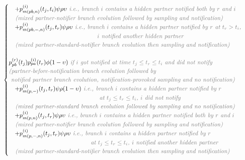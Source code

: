 \documentclass[10pt,letterpaper]{article}
\begin{document}
\begin{equation}
\begin{array}{ll}
\begin{cases}
 ~~~+p_{m(pb,n)}^{(i)}(t_j,t_i)\psi\rho\upsilon \textit{\color{gray} ~i.e., branch $i$ contains a hidden partner notified both by $r$ and $i$}\\
 \textit{\color{gray} ~~~(mixed partner-notifier branch evolution followed by sampling and notification)}
\\
~~~+p_{m(pb,-,n)}^{(i)}(t_j,t_r)\psi\rho\upsilon  \textit{\color{gray} ~i.e., branch $i$ contains a hidden partner notified by $r$ at $t_r > t_i$, }\\
\textit{\color{gray} ~~~~~~~~~~~~~~~~~~~~~~~~~~~~~~~~~~~~~~~~~$i$ notified another hidden partner}\\
 \textit{\color{gray} ~~~(mixed partner-standard-notifier branch evolution then sampling and notification)}
\\
\\
p_{pb}^{(r)}(t_j) p_{pa}^{(i)}(t_r) \phi (1-\upsilon) \textit{\color{gray} ~if $i$ got notified at time $t_j \leq t_r \leq t_i$ and did not notify}\\
\textit{\color{gray} (partner-before-notification branch evolution followed by} \\
\textit{\color{gray}~notified partner branch evolution, notification-provoked sampling and no notification)}
\\
~~~+p_{m(p,-)}^{(i)}(t_j,t_r)\psi\rho(1-\upsilon) \textit{\color{gray} ~i.e., branch $i$ contains a hidden partner notified by $r$}\\
\textit{\color{gray} ~~~~~~~~~~~~~~~~~~~~~~~~~~~~~~~~~~~~~~~~~~at $t_j \leq t_r \leq t_i$, $i$  did not notify}\\
 \textit{\color{gray} ~~~(mixed partner-standard branch evolution followed by sampling and no notification)}\\
 ~~~+p_{m(p,n)}^{(i)}(t_j,t_r)\psi\rho\upsilon \textit{\color{gray} ~i.e., branch $i$ contains a hidden partner notified both by $r$ and $i$}\\
 \textit{\color{gray} ~~~(mixed partner-notifier branch evolution followed by sampling and notification)}
\\
~~~+p_{m(p,-,n)}^{(i)}(t_j,t_r)\psi\rho\upsilon  \textit{\color{gray} ~i.e., branch $i$ contains a hidden partner notified by $r$}\\
\textit{\color{gray} ~~~~~~~~~~~~~~~~~~~~~~~~~~~~~~~~~~~~~~at $t_j \leq t_r \leq t_i$, $i$ notified another hidden partner}\\
 \textit{\color{gray} ~~~(mixed partner-standard-notifier branch evolution then sampling and notification)}
\end{cases}
\end{array}
\label{eq:tipxx}
\end{equation}
\end{document}
